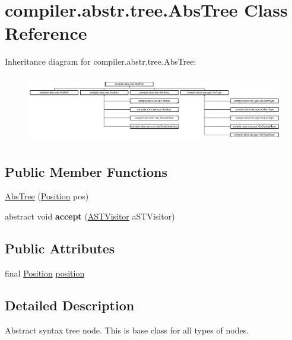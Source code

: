 \hypertarget{classcompiler_1_1abstr_1_1tree_1_1_abs_tree}{}\section{compiler.\+abstr.\+tree.\+Abs\+Tree Class Reference}
\label{classcompiler_1_1abstr_1_1tree_1_1_abs_tree}
Inheritance diagram for compiler.\+abstr.\+tree.\+Abs\+Tree\+:\begin{figure}[H]
\begin{center}
\leavevmode
\includegraphics[height=2.980989cm]{classcompiler_1_1abstr_1_1tree_1_1_abs_tree}
\end{center}
\end{figure}
\subsection*{Public Member Functions}
\begin{DoxyCompactItemize}
\item 
\hyperlink{classcompiler_1_1abstr_1_1tree_1_1_abs_tree_a4685afe81da918ece73cdcac477c810c}{Abs\+Tree} (\hyperlink{classcompiler_1_1_position}{Position} pos)
\item 
\mbox{\label{classcompiler_1_1abstr_1_1tree_1_1_abs_tree_adc0914a591fdf026f83d51bbe2c8cf55}} 
abstract void {\bfseries accept} (\hyperlink{interfacecompiler_1_1abstr_1_1_a_s_t_visitor}{A\+S\+T\+Visitor} a\+S\+T\+Visitor)
\end{DoxyCompactItemize}
\subsection*{Public Attributes}
\begin{DoxyCompactItemize}
\item 
final \hyperlink{classcompiler_1_1_position}{Position} \hyperlink{classcompiler_1_1abstr_1_1tree_1_1_abs_tree_a127a686d3a3f9ba470f36c6b3336caea}{position}
\end{DoxyCompactItemize}


\subsection{Detailed Description}
Abstract syntax tree node. This is base class for all types of nodes.

